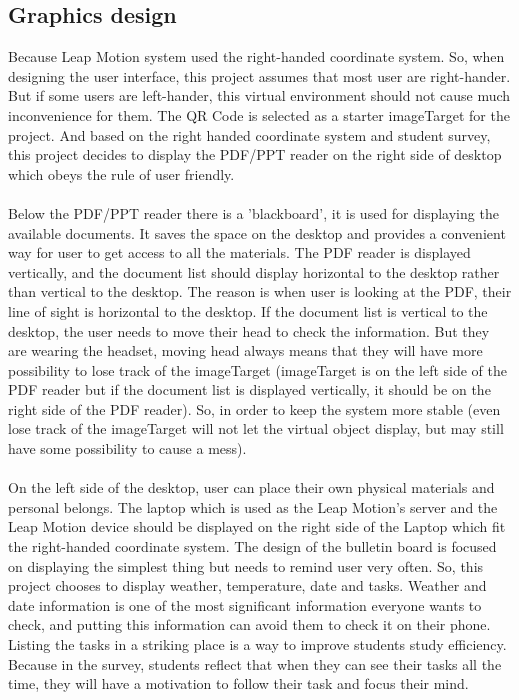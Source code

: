 \subsection{Graphics design}
Because Leap Motion system used the right-handed coordinate system. So, when designing the user interface, this project assumes that most user are right-hander. But if some users are left-hander, this virtual environment should not cause much inconvenience for them. The QR Code is selected as a starter imageTarget for the project. And based on the right handed coordinate system and student survey, this project decides to display the PDF/PPT reader on the right side of desktop which obeys the rule of user friendly. 
\\
\\
Below the PDF/PPT reader there is a ’blackboard’, it is used for displaying the available documents. It saves the space on the desktop and provides a convenient way for user to get access to all the materials. The PDF reader is displayed vertically, and the document list should display horizontal to the desktop rather than vertical to the desktop. The reason is when user is looking at the PDF, their line of sight is horizontal to the desktop. If the document list is vertical to the desktop, the user needs to move their head to check the information. But they are wearing the headset, moving head always means that they will have more possibility to lose track of the imageTarget (imageTarget is on the left side of the PDF reader but if the document list is displayed vertically, it should be on the right side of the PDF reader). So, in order to keep the system more stable (even lose track of the imageTarget will not let the virtual object display, but may still have some possibility to cause a mess). 
\\
\\
On the left side of the desktop, user can place their own physical materials and personal belongs. The laptop which is used as the Leap Motion’s server and the Leap Motion device should be displayed on the right side of the Laptop which fit the right-handed coordinate system. The design of the bulletin board is focused on displaying the simplest thing but needs to remind user very often. So, this project chooses to display weather, temperature, date and tasks. Weather and date information is one of the most significant information everyone wants to check, and putting this information can avoid them to check it on their phone. Listing the tasks in a striking place is a way to improve students study efficiency. Because in the survey, students reflect that when they can see their tasks all the time, they will have a motivation to follow their task and focus their mind. 
